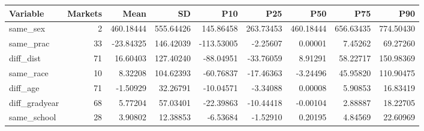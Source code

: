 \begin{table}[!h]
\centering
\begin{tabular}{lrrrrrrrr}
\toprule
Variable & Markets & Mean & SD & P10 & P25 & P50 & P75 & P90\\
\midrule
same\_sex & 2 & 460.18444 & 555.64426 & 145.86458 & 263.73453 & 460.18444 & 656.63435 & 774.50430\\
same\_prac & 33 & -23.84325 & 146.42039 & -113.53005 & -2.25607 & 0.00001 & 7.45262 & 69.27260\\
diff\_dist & 71 & 16.60403 & 127.40240 & -88.04951 & -33.76059 & 8.91291 & 58.22717 & 150.98369\\
same\_race & 10 & 8.32208 & 104.62393 & -60.76837 & -17.46363 & -3.24496 & 45.95820 & 110.90475\\
diff\_age & 71 & -1.50929 & 32.26791 & -10.04571 & -3.34088 & 0.00008 & 5.90853 & 16.83419\\
\addlinespace
diff\_gradyear & 68 & 5.77204 & 57.03401 & -22.39863 & -10.44418 & -0.00104 & 2.88887 & 18.22705\\
same\_school & 28 & 3.90802 & 12.38853 & -6.53684 & -1.52910 & 0.20195 & 4.84569 & 22.60969\\
\bottomrule
\end{tabular}
\end{table}
